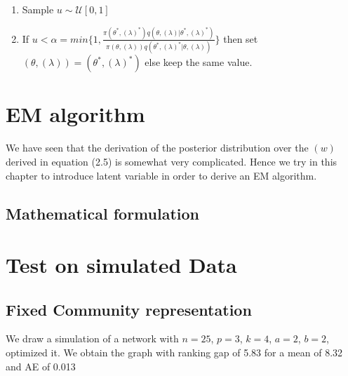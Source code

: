 \documentclass[12pt]{ociamthesis}  %
\begin{document}
\begin{enumerate}
\begin{enumerate}
	\item Sample $u \sim \mathcal{U}[0,1]$
	
	\item If $u < \alpha = min\{ 1, \frac{\pi(\theta^{*}, (\lambda)^{*})q(\theta, (\lambda) |\theta^{*}, (\lambda)^{*})}{\pi(\theta, (\lambda))q(\theta^{*}, (\lambda)^{*} |\theta, (\lambda))}   \}$ then set $(\theta, (\lambda)) = (\theta^{*}, (\lambda)^{*})$ else keep the same value.
	
	
	
	\end{enumerate}
	
	\end{enumerate}
	
	\chapter{EM algorithm}
	
	We have seen that the derivation of the posterior distribution over the $(w)$ derived in equation (2.5) is somewhat very complicated. Hence we try in this chapter to introduce latent variable in order to derive an EM algorithm.
	
	\section{Mathematical formulation}
	
	
	
	
	\chapter{Test on simulated Data}
	
	\section{Fixed Community representation}
	
	We draw a simulation of a network with $n = 25$, $ p = 3$, $k = 4$, $a = 2$, $b = 2$, optimized it. We obtain the graph with ranking gap of 5.83 for a mean of 8.32 and AE of 0.013
		
\end{document}
